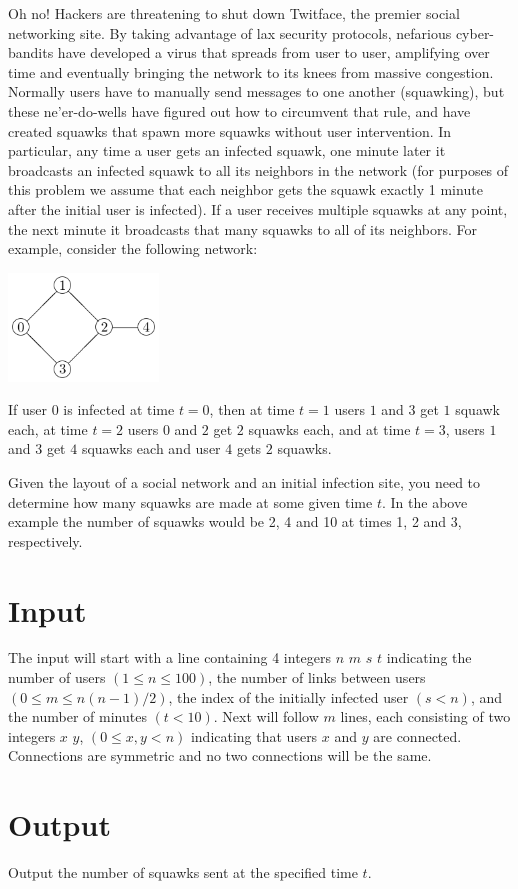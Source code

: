 
Oh no! Hackers are threatening to shut down Twitface, the premier social networking
site. By taking advantage of lax security protocols, nefarious cyber-bandits have
developed a virus that spreads from user to user, amplifying over time and eventually
bringing the network to its knees from massive congestion.  Normally users have to
manually send messages to one another (squawking), but these ne'er-do-wells have
figured out how to circumvent that rule, and have created squawks that spawn more
squawks without user intervention.  In particular, any time a user gets an infected
squawk, one minute later it broadcasts an infected squawk to all its neighbors in the
network (for purposes of this problem we assume that each neighbor gets the squawk
exactly 1 minute after the initial user is infected). If a user receives multiple
squawks at any point, the next minute it broadcasts that many squawks to all of its
neighbors.  For example, consider the following network:
\begin{center}
\includegraphics[width=0.3\textwidth]{graph}
\end{center}
If user $0$ is infected at time $t=0$, then at time $t=1$ users $1$ and $3$ get
$1$ squawk each, at time $t=2$ users $0$ and $2$ get $2$ squawks each, and at
time $t=3$, users $1$ and $3$ get $4$ squawks each and user $4$ gets $2$ squawks.

Given the layout of a social network and an initial infection site, you need to
determine how many squawks are made at some given time $t$.  In the above example
the number of squawks would be 2, 4 and 10 at times 1, 2 and 3, respectively.

\section*{Input}

The input will start with a line containing 4 integers $n$ $m$ $s$ $t$
indicating the number of users $(1\le n \leq 100)$, the number of links between
users $(0\le m \leq n(n-1)/2)$, the index of the initially infected user
$(s < n)$, and the number of minutes $(t < 10)$. Next will follow $m$ lines,
each consisting of two integers $x$ $y$, $(0 \leq x, y < n)$ indicating that
users $x$ and $y$ are connected. Connections are symmetric and no two
connections will be the same.
\newpage
\section*{Output}

Output the number of squawks sent at the specified time $t$.

